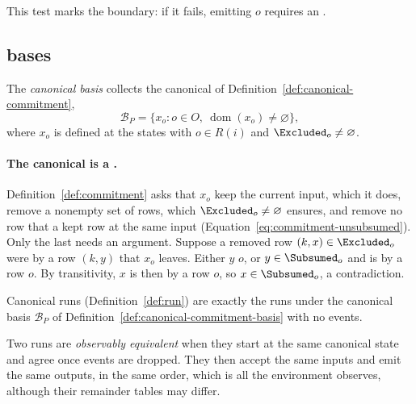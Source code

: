 This test marks the \commitment boundary: if it fails, emitting $o$ requires an
\commitment.

\subsection{\Commitment bases}
\label{app:commitment-bases}

\begin{definition}
\label{def:canonical-commitment-basis}
The \emph{canonical \commitment basis} collects the canonical \commitments of
Definition~\ref{def:canonical-commitment},
\begin{equation}
  \mathcal B_P
    =\{x_o:o\in O,\ \operatorname{dom}(x_o)\neq\varnothing\},
  \label{eq:canonical-commitment-basis-relational}
\end{equation}
where $x_o$ is defined at the states with $o\in R(i)$ and $\Excluded_o\neq\varnothing$.
\end{definition}

\paragraph{The canonical \commitment is a \commitment.}
Definition~\ref{def:commitment} asks that $x_o$ keep the current input, which
it does, remove a nonempty set of rows, which $\Excluded_o\neq\varnothing$
ensures, and remove no row that a kept row at the same input \outrel
(Equation~\ref{eq:commitment-unsubsumed}).  Only the last needs an argument.
Suppose a removed row $(k,x)\in\Excluded_o$ were \outrelpast by a row $(k,y)$
that $x_o$ leaves.  Either $y$ \outrel $o$, or $y\in\Subsumed_o$ and is
\outrelpast by a row \outrelpart $o$.  By transitivity, $x$ is then
\outrelpast by a row \outrelpart $o$, so $x\in\Subsumed_o$, a contradiction.

Canonical runs (Definition~\ref{def:run}) are exactly the runs under the
canonical basis $\mathcal B_P$ of Definition~\ref{def:canonical-commitment-basis}
with no \commitment events.

Two runs are \emph{observably equivalent} when they start at the same canonical
state and agree once \commitment events are dropped.  They then accept the same
inputs and emit the same outputs, in the same order, which is all the
environment observes, although their remainder tables may differ.

